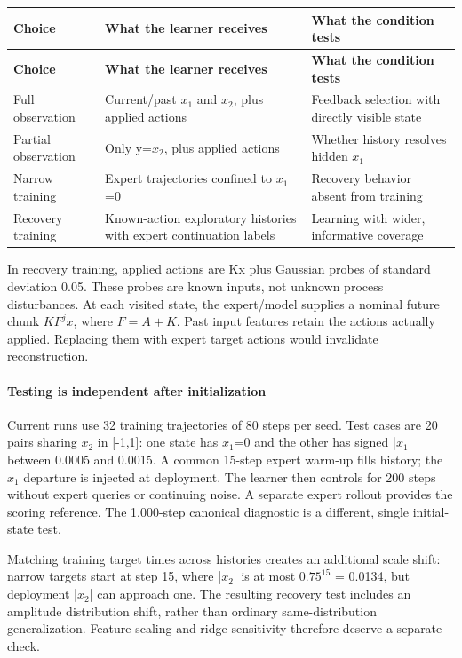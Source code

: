 \documentclass{l4dc2026}
\begin{document}
{\small\setlength{\tabcolsep}{3pt}
\begin{longtable}{@{}p{}p{}p{}@{}}
\toprule
\textbf{Choice} & \textbf{What the learner receives} & \textbf{What the condition tests} \\
\midrule\endfirsthead
\toprule
\textbf{Choice} & \textbf{What the learner receives} & \textbf{What the condition tests} \\
\midrule\endhead
\bottomrule\endfoot
Full observation & Current/past $x_1$ and $x_2$, plus applied actions & Feedback selection with directly visible state \\
Partial observation & Only y=$x_2$, plus applied actions & Whether history resolves hidden $x_1$ \\
Narrow training & Expert trajectories confined to $x_1$=0 & Recovery behavior absent from training \\
Recovery training & Known-action exploratory histories with expert continuation labels & Learning with wider, informative coverage \\
\end{longtable}}

In recovery training, applied actions are Kx plus Gaussian probes of standard deviation 0.05. These probes are known inputs, not unknown process disturbances. At each visited state, the expert/model supplies a nominal future chunk $KF^j x$, where $F=A+K$. Past input features retain the actions actually applied. Replacing them with expert target actions would invalidate reconstruction.

\paragraph{Testing is independent after initialization}
Current runs use 32 training trajectories of 80 steps per seed. Test cases are 20 pairs sharing $x_2$ in [-1,1]: one state has $x_1$=0 and the other has signed |$x_1$| between 0.0005 and 0.0015. A common 15-step expert warm-up fills history; the $x_1$ departure is injected at deployment. The learner then controls for 200 steps without expert queries or continuing noise. A separate expert rollout provides the scoring reference. The 1,000-step canonical diagnostic is a different, single initial-state test.

{\small Matching training target times across histories creates an additional scale shift: narrow targets start at step 15, where |$x_2$| is at most $0.75^{15}$ = 0.0134, but deployment |$x_2$| can approach one. The resulting recovery test includes an amplitude distribution shift, rather than ordinary same-distribution generalization. Feature scaling and ridge sensitivity therefore deserve a separate check.\par}
\end{document}
